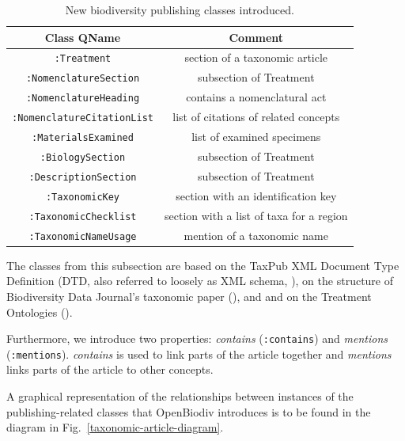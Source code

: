 \begin{table}[h!]
\caption{New biodiversity publishing classes introduced.}
      \begin{tabular}{cc}
        \hline
          Class QName             & Comment\\  \hline
  {\tt :Treatment}                & section of a taxonomic article\\
  {\tt :NomenclatureSection}      & subsection of Treatment\\
  {\tt :NomenclatureHeading}      & contains a nomenclatural act \\
  {\tt :NomenclatureCitationList} & list of citations of related concepts\\
  {\tt :MaterialsExamined}        & list of examined specimens\\
  {\tt :BiologySection}           & subsection of Treatment\\
  {\tt :DescriptionSection}       & subsection of Treatment\\
  {\tt :TaxonomicKey}             & section with an identification key\\
  {\tt :TaxonomicChecklist}       & section with a list of taxa for a region\\ 
  {\tt :TaxonomicNameUsage}       & mention of a taxonomic name\\ \hline

      \end{tabular}
      \label{bibliographic_classes}
\end{table}

The classes from this subsection are based on the TaxPub XML Document Type Definition (DTD, also referred to loosely as XML schema, \cite{catapano_taxpub:_2010}), on the structure of Biodiversity Data Journal's
taxonomic paper (\cite{smith_beyond_2013}), and and on the Treatment Ontologies (\cite{catapano_treatment_2016}).

Furthermore, we introduce two properties: \emph{contains} ({\tt :contains}) and \emph{mentions} ({\tt :mentions}). \emph{contains} is used to link parts of the article together and \emph{mentions} links parts of the article to other concepts.

A graphical representation of the relationships between instances of the publishing-related classes that OpenBiodiv introduces is to be found in the diagram in Fig.~\ref{taxonomic-article-diagram}.

